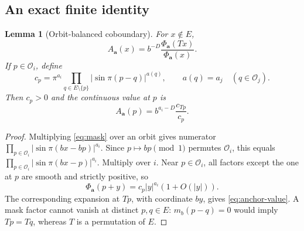 \documentclass[11pt,a4paper]{article}
\numberwithin{equation}{section}
\newtheorem{lemma}[lemma]{Lemma}\aliascntresetthe{lemma}
\theoremstyle{definition}
\theoremstyle{remark}
\newcommand{\cO}{\mathcal O}
\begin{document}
\subsection{An exact finite identity}
\begin{lemma}[Orbit-balanced coboundary]
\label{lem:coboundary}
For $x\notin E$,
\begin{equation}
 A_{\boldsymbol a}(x)
   =b^{-D}\frac{\Phi_{\boldsymbol a}(Tx)}{\Phi_{\boldsymbol a}(x)}.
 \label{eq:coboundary}
\end{equation}
If $p\in\cO_i$, define
\begin{equation}
 c_p=\pi^{a_i}\prod_{q\in E\setminus\{p\}}
                  |\sin\pi(p-q)|^{a(q)},
 \qquad a(q)=a_j\quad(q\in\cO_j).
 \label{eq:cp}
\end{equation}
Then $c_p>0$ and the continuous value at $p$ is
\begin{equation}
 A_{\boldsymbol a}(p)=b^{a_i-D}\frac{c_{Tp}}{c_p}.
 \label{eq:anchor-value}
\end{equation}
\end{lemma}
\begin{proof}
Multiplying \cref{eq:mask} over an orbit gives numerator
$\prod_{p\in\cO_i}|\sin\pi(bx-bp)|^{a_i}$.
Since $p\mapsto bp\pmod1$ permutes $\cO_i$, this equals
$\prod_{p\in\cO_i}|\sin\pi(bx-p)|^{a_i}$. Multiply over $i$.
Near $p\in\cO_i$, all factors except the one at $p$ are smooth and
strictly positive, so
\begin{equation}
 \Phi_{\boldsymbol a}(p+y)=c_p|y|^{a_i}(1+O(|y|)).
 \label{eq:local-phi}
\end{equation}
The corresponding expansion at $Tp$, with coordinate $by$, gives
\cref{eq:anchor-value}. A mask factor cannot vanish at distinct
$p,q\in E$: $m_b(p-q)=0$ would imply $Tp=Tq$, whereas $T$ is a
permutation of $E$.
\end{proof}
\end{document}
